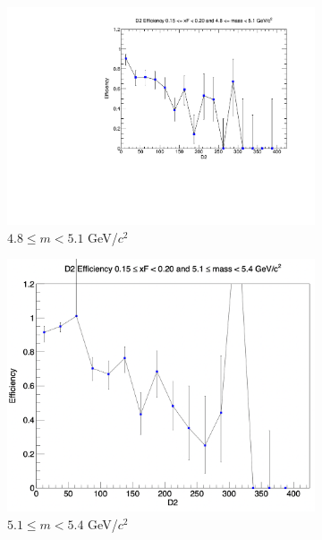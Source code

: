 \begin{figure}[p]
\begin{subfigure}[b]{0.32\textwidth}
        \centering
        \includegraphics[width=\textwidth]{./kTrackerEfficiencyPlots/D2_Efficiency_xF3_mass2.pdf}
        \caption{$4.8 \leq m < 5.1$ GeV/$c^2$}
        \label{fig:xF3_mass2}
    \end{subfigure}
    \vspace{0.5cm}
    \begin{subfigure}[b]{0.32\textwidth}
        \centering
        \includegraphics[width=\textwidth]{./kTrackerEfficiencyPlots/D2_Efficiency_xF3_mass3.png}
        \caption{$5.1 \leq m < 5.4$ GeV/$c^2$}
        \label{fig:xF3_mass3}
    \end{subfigure}
    \hfill
    \begin{subfigure}[b]{0.32\textwidth}

\end{subfigure}
\end{figure}
